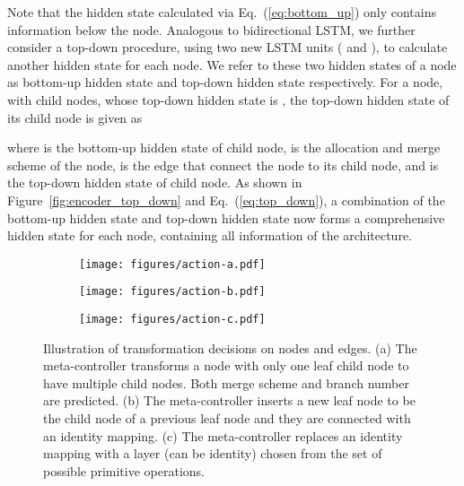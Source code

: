\documentclass{article}
\begin{document}
Note that the hidden state calculated via Eq.~(\ref{eq:bottom_up}) only contains information below the node. Analogous to bidirectional LSTM, we further consider a top-down procedure, using two new LSTM units ( and ), to calculate another hidden state for each node. We refer to these two hidden states of a node as bottom-up hidden state and top-down hidden state respectively. For a node, with  child nodes, whose top-down hidden state is , the top-down hidden state of its  child node is given as
{\small

}where  is the bottom-up hidden state of  child node,  is the allocation and merge scheme of the node,  is the edge that connect the node to its  child node, and  is the top-down hidden state of  child node. As shown in Figure~\ref{fig:encoder_top_down} and Eq.~(\ref{eq:top_down}), a combination of the bottom-up hidden state and top-down hidden state now forms a comprehensive hidden state for each node, containing all information of the architecture. 

\begin{figure}[t]
	\centering
\begin{subfigure}{0.32\linewidth}
		\centering
		\texttt{[image: figures/action-a.pdf]}
		\caption{}
		\label{fig:action-a}
		\vspace{-0pt}
	\end{subfigure}
\begin{subfigure}{0.32\linewidth}
		\centering
		\hspace{10pt}
		\texttt{[image: figures/action-b.pdf]}
		\caption{}
		\label{fig:action-b}
		\vspace{-0pt}
	\end{subfigure}	
\begin{subfigure}{0.32\linewidth}
		\centering
		\texttt{[image: figures/action-c.pdf]}
		\caption{}
		\label{fig:action-c}
		\vspace{-0pt}
	\end{subfigure}	
	\caption{
		Illustration of transformation decisions on nodes and edges. (a) The meta-controller transforms a node with only one leaf child node to have multiple child nodes. Both merge scheme and branch number are predicted.  (b) The meta-controller inserts a new leaf node to be the child node of a previous leaf node and they are connected with an identity mapping. (c) The meta-controller replaces an identity mapping with a layer (can be identity) chosen from the set of possible primitive operations.
	}
	\label{fig:actions}
\end{figure}
\end{document}
